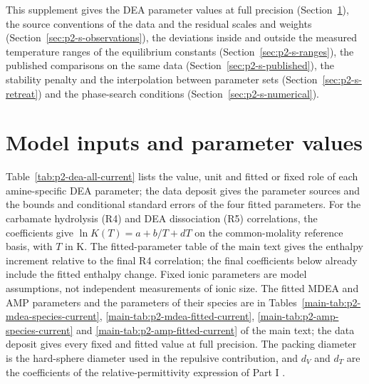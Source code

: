 This supplement gives the DEA parameter values at full precision (Section~\ref{sec:p2-s-parameters}), the source conventions of the data and the residual scales and weights (Section~\ref{sec:p2-s-observations}), the deviations inside and outside the measured temperature ranges of the equilibrium constants (Section~\ref{sec:p2-s-ranges}), the published comparisons on the same data (Section~\ref{sec:p2-s-published}), the stability penalty and the interpolation between parameter sets (Section~\ref{sec:p2-s-retreat}) and the phase-search conditions (Section~\ref{sec:p2-s-numerical}).

\section{Model inputs and parameter values}\label{sec:p2-s-parameters}
Table~\ref{tab:p2-dea-all-current} lists the value, unit and fitted or fixed role of each amine-specific DEA parameter; the data deposit gives the parameter sources and the bounds and conditional standard errors of the four fitted parameters.
For the carbamate hydrolysis (R4) and DEA dissociation (R5) correlations, the coefficients give $\ln K(T)=a+b/T+dT$ on the common-molality reference basis, with $T$ in K.
The fitted-parameter table of the main text gives the enthalpy increment relative to the final R4 correlation; the final coefficients below already include the fitted enthalpy change.
Fixed ionic parameters are model assumptions, not independent measurements of ionic size.
The fitted MDEA and AMP parameters and the parameters of their species are in Tables~\ref{main-tab:p2-mdea-species-current}, \ref{main-tab:p2-mdea-fitted-current}, \ref{main-tab:p2-amp-species-current} and \ref{main-tab:p2-amp-fitted-current} of the main text; the data deposit gives every fixed and fitted value at full precision.
The packing diameter is the hard-sphere diameter used in the repulsive contribution, and $d_V$ and $d_T$ are the coefficients of the relative-permittivity expression of Part I \cite[Sect.~2.1]{PolleyPartI}.



